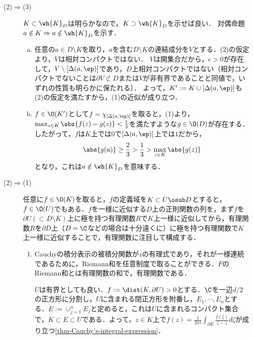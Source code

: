 \documentclass[uplatex, dvipdfmx]{jsreport}
\begin{document}
\begin{Proof}
\begin{description}
\begin{enumerate}[(a)]
        \end{enumerate}
        \item[(2)$\Rightarrow$(3)] 
        $K\subset\wh{K}_D$は明らかなので，$K\supset\wh{K}_D$を示せば良い．
        対偶命題$a\notin K\Rightarrow a\notin\wh{K}_D$を示す．
        \begin{enumerate}[(a)]
            \item 任意の$a\in D\setminus K$を取り，$a$を含む$D\setminus K$の連結成分を$V$とする．(2)の仮定より，$V$は相対コンパクトではない．
            $V$は開集合だから，$\epsilon>0$が存在して，$V\setminus[\Delta(a,\ep)]$であり，$D$上相対コンパクトではない（相対コンパクトでないことは$\partial V\not\subset D$または$V$が非有界であることと同値で，いずれの性質も明らかに保たれる）．
            よって，$K':=K\cup[\Delta(a,\ep)]$も(2)の仮定を満たすから，(1)の近似が成り立つ．
            \item $f\in\O(K')$として$f=\chi_{[\Delta(a,\ep)]}$を取ると，(1)より，$\max_{z\in K}\abs{f(z)-g(z)}<\frac{1}{3}$を満たすような$g\in\O(D)$が存在する．したがって，$f$は$K$上では$0$で$[\Delta(a,\ep)]$上では$1$だから，
            \[\abs{g(a)}\ge\frac{2}{3}>\frac{1}{3}>\max_{z\in K}\abs{g(z)}\]
            となり，これは$a\notin\wh{K}_D$を意味する．
        \end{enumerate}
        \item[(2)$\Rightarrow$(1)] 
        任意に$f\in\O(K)$を取ると，$f$の定義域を$K\subset U\osub D$とすると，$f\in\O(U)$でもある．$f$を一様に近似する$D$上の正則関数の列を，まず$f$を$\partial U(\subset D\setminus K)$上に極を持つ有理関数$R$で$K$上一様に近似してから，有理関数$R$を$\partial D$上（$D=\C$などの場合は十分遠くに）に極を持つ有理関数で$K$上一様に近似することで，有理関数に注目して構成する．
        \begin{enumerate}
            \item Cauchyの積分表示の被積分関数が$z$の有理式であり，それが一様連続であるために，Riemann和を任意制度で取ることができる．$F$のRiemann和とは有理関数の和で，有理関数である．
            
            $U$は有界としても良い．$f:=\dist(K,\partial U)>0$とする．$\C$を一辺$d/2$の正方形に分割し，$U$に含まれる閉正方形を附番し，$E_1,\cdots,E_n$とする．$E:=\cup_{j=1}^nE_j$と定めると，これは$U$に含まれるコンパクト集合で，$K\subset E\subset U$である．よって，$z\in K$上で$f(z)=\frac{1}{2\pi i}\int_{\partial E}\frac{f(\zeta)}{\zeta-z}d\zeta$が成り立つ\ref{thm-Cauchy's-integral-expression}．


\end{enumerate}
\end{description}
\end{Proof}
\end{document}
